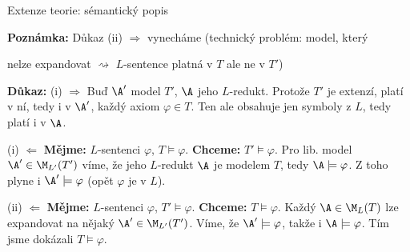 \documentclass{beamer}
\begin{document}
\begin{frame}{Extenze teorie: sémantický popis}

    
    {\small \textbf{Poznámka:} Důkaz \alert{(ii) \Large $\Rightarrow$} vynecháme (technický problém: model, který

    \vspace{-11pt} nelze expandovat $\rightsquigarrow$ $L$-sentence platná v $T$ ale ne v $T'$)}\pause 

    \vspace{-3pt}
    \textbf{Důkaz:}\pause 
    \alert{(i) \Large $\Rightarrow$} Buď $\A'$ model $T'$, $\A$ jeho $L$-redukt. \pause Protože $T'$ je extenzí, platí v ní, tedy i v $\A'$, každý axiom $\varphi\in T$. Ten ale obsahuje jen symboly z $L$, tedy platí i v $\A$.
    
    \pause 
    \vspace{-3pt}
    \alert{(i) \Large $\Leftarrow$} \textbf{Mějme:} $L$-sentenci $\varphi$,  $T\models\varphi$. \textbf{Chceme:} $T'\models\varphi$. \pause Pro lib. model $\A'\in\M_{L'}(T')$ víme, že jeho $L$-redukt $\A$ je modelem $T$, tedy $\A\models\varphi$. Z toho plyne i $\A'\models\varphi$ (opět $\varphi$ je v $L$).
    
    \pause 
    \vspace{-3pt}
    \alert{(ii) \Large $\Leftarrow$} \textbf{Mějme:} $L$-sentenci $\varphi$,  $T'\models\varphi$. \textbf{Chceme:} $T\models\varphi$. \pause Každý $\A\in\M_L(T)$ lze expandovat na nějaký $\A'\in\M_{L'}(T')$. Víme, že $\A'\models\varphi$, takže i $\A\models\varphi$. Tím jsme dokázali $T\models\varphi$.    
    \hfill\qedsymbol
    
\end{frame}
\end{document}
